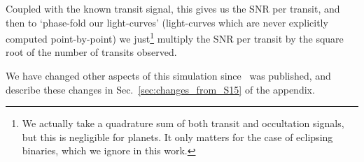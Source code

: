 Coupled with the known transit signal, this gives us the SNR per transit, and then to `phase-fold our light-curves' (light-curves which are never explicitly computed point-by-point) we just\footnote{We actually take a quadrature sum of both transit and occultation signals, but this is negligible for planets. It only matters for the case of eclipsing binaries, which we ignore in this work.} multiply the SNR per transit by the square root of the number of transits observed.
 
We have changed other aspects of this simulation since~ was published, and describe these changes in Sec.~\ref{sec:changes_from_S15} of the appendix.